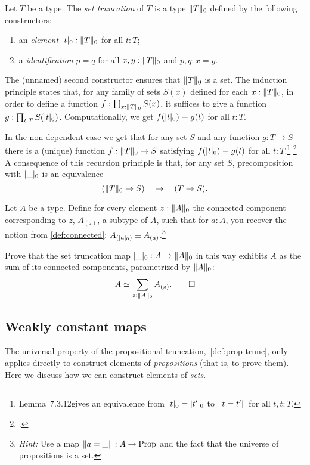 \begin{definition}\label{def:set-truncation}
Let $T$ be a type. The \emph{set truncation} of $T$
is a type  $\lVert T\rVert_0$ defined by the following constructors:
\begin{enumerate}
\item an \emph{element} $\lvert t\rvert_0 : \lVert T\rVert_0$ for all $t:T$;
\item a \emph{identification} $p=q$ for all $x,y:\lVert T\rVert_0$ and $p,q: x=y$.
\end{enumerate}
The (unnamed) second constructor ensures that $\lVert T\rVert_0$ is a
set. The induction principle states that,
for any family of sets $S(x)$ defined for each $x:\lVert T\rVert_0$,
in order to define a function $f:\prod_{x:\lVert T\rVert_0} S(x)$,
it suffices to give a function $g: \prod_{t:T} S(\lvert t\rvert_0)$.
Computationally, we get $f(\trunc{t}_0)\jdeq g(t)$ for all $t:T$.
\end{definition}

In the non-dependent case we get that for any set $S$ and
any function $g: T\to S$ there is a (unique) function $f:\lVert T\rVert_0\to S$
satisfying $f(\trunc{t}_0)\jdeq g(t)$ for all $t:T$.\footnote{%
Lemma~7.3.12\footnotemark gives an equivalence from
$\lvert t\rvert_0 = \lvert t'\rvert_0$ to $\lVert t=t'\rVert$ for all $t,t:T$.}%
\footcitetext{hottbook}
A consequence of this recursion principle is that,
for any set $S$, precomposition with $\lvert\_\rvert_0$ is an equivalence
\[
(\lVert T\rVert_0 \to S) \quad \to \quad (T \to S).
\]
\begin{xca}\label{xca:sum-of-conn-compoenents}
  Let $A$ be a type. Define for every element $z : \lVert A\rVert_0$
  the connected component corresponding to $z$, $A_{(z)}$,
  a subtype of $A$, such that for $a:A$, you recover the notion from
  \cref{def:connected}: $A_{(\trunc{a}_0)} \jdeq A_{(a)}$.\footnote{%
    \emph{Hint:} Use a map $\lVert a={\_}\rVert : A \to \mathrm{Prop}$
    and the fact that the universe of propositions
    is a set.}

  Prove that the set truncation map $\lvert\_\rvert_0 : A \to \lVert A\rVert_0$
  in this way exhibits $A$ as the sum of its connected components,
  parametrized by $\lVert A\rVert_0$:
  \[
    A \simeq \sum_{z : \lVert A\rVert_0} A_{(z)}. \qedhere
  \]
\end{xca}

\subsection{Weakly constant maps}

The universal property of the propositional truncation,~\cref{def:prop-trunc},
only applies directly to construct elements of \emph{propositions} (that is, to prove them).
Here we discuss how we can construct elements of \emph{sets}.

